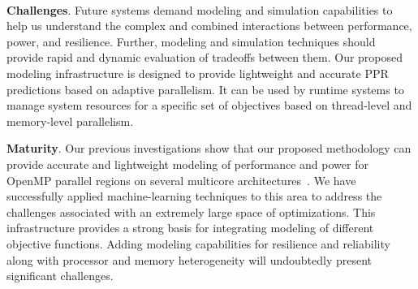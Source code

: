 \documentclass{article}  %
\begin{document}
\vspace{10pt}

   \\
\textbf{Challenges}. 
Future systems demand modeling and simulation capabilities to help us
understand the complex and combined interactions between performance,
power, and resilience. Further, modeling and simulation techniques
should provide rapid and dynamic evaluation of tradeoffs between
them. Our proposed modeling infrastructure is designed to provide
lightweight and accurate PPR predictions based on adaptive
parallelism. It can be used by runtime systems to manage system
resources for a specific set of objectives based on thread-level and
memory-level parallelism.  


\noindent\textbf{Maturity}. 
Our previous investigations show that our
proposed methodology can provide accurate and lightweight modeling 
of performance and power for OpenMP parallel regions on several
multicore architectures~\cite{mpiopenmp_ipdps10, mpiopenmp_tpds13,
  taskconsolidation_ipdps10, dct_iiswc12, dct_pmbs11}. We have
successfully applied  
machine-learning techniques to this area to address the challenges
associated with an extremely large space of optimizations. This 
infrastructure provides a strong basis for integrating
modeling of different objective functions. Adding modeling
capabilities for resilience and reliability along with processor and
memory heterogeneity will undoubtedly present significant challenges. 

\end{document}
